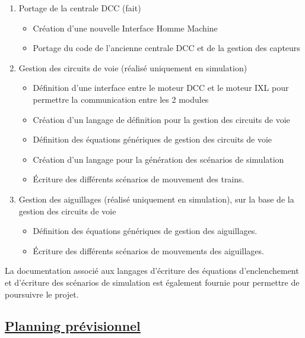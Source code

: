 \begin{enumerate}[1]
  \item Portage de la centrale DCC (fait)
  \begin{itemize}
    \item Création d'une nouvelle Interface
      Homme Machine
    \item Portage du code de l'ancienne centrale DCC et de la
      gestion des capteurs
  \end{itemize}

  \item Gestion des circuits de voie (réalisé uniquement en simulation)
  \begin{itemize}
    \item D\'efinition d'une interface entre le moteur DCC et le moteur IXL pour
      permettre la communication entre les 2 modules
    \item Cr\'eation d'un langage de d\'efinition pour la gestion des circuits
      de voie
    \item D\'efinition des \'equations g\'en\'eriques de gestion des circuits
      de voie
    \item Cr\'eation d'un langage pour la g\'en\'eration des sc\'enarios de
      simulation
    \item \'Ecriture des diff\'erents sc\'enarios de mouvement des trains.
  \end{itemize}

  
  \item Gestion des aiguillages (réalisé uniquement en simulation), sur la
  base de la gestion des circuits de voie  
    \begin{itemize} 
      \item D\'efinition des \'equations g\'en\'eriques de gestion des aiguillages.
    \item \'Ecriture des diff\'erents sc\'enarios de mouvements des aiguillages.
    \end{itemize}
\end{enumerate}

La documentation associ\'e aux langages d'\'ecriture des \'equations
d'enclenchement et d'\'ecriture des sc\'enarios de simulation est
\'egalement fournie pour permettre de poursuivre le projet.


\newpage

\subsection{\underline{Planning pr\'evisionnel}}
\label{sec:planning}

